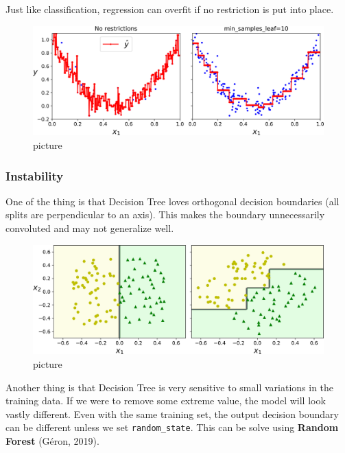 \documentclass[
  letterpaper,
  DIV=11,
  numbers=noendperiod]{scrartcl}
\begin{document}
Just like classification, regression can overfit if no restriction is
put into place.

\begin{figure}[H]

{\centering \includegraphics{16.png}

}

\caption{picture}

\end{figure}%

\subsubsection{Instability}\label{instability}

One of the thing is that Decision Tree loves orthogonal decision
boundaries (all splits are perpendicular to an axis). This makes the
boundary unnecessarily convoluted and may not generalize well.

\begin{figure}[H]

{\centering \includegraphics{17.png}

}

\caption{picture}

\end{figure}%

Another thing is that Decision Tree is very sensitive to small
variations in the training data. If we were to remove some extreme
value, the model will look vastly different. Even with the same training
set, the output decision boundary can be different unless we set
\texttt{random\_state}. This can be solve using \textbf{Random Forest}
(Géron, 2019).
\end{document}
